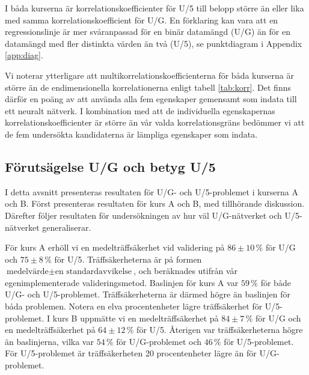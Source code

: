 I båda kurserna är korrelationskoefficienter för U/5 till belopp större än eller lika med samma korrelationskoefficient för U/G. En förklaring kan vara att en regressionslinje är mer svåranpassad för en binär datamängd (U/G) än för en datamängd med fler distinkta värden än två (U/5), se punktdiagram i Appendix \ref{app:diag}. 

Vi noterar ytterligare att multikorrelationskoefficienterna för båda kurserna är större än de endimensionella korrelationerna enligt tabell \ref{tab:korr}. Det finns därför en poäng av att använda alla fem egenskaper gemensamt som indata till ett neuralt nätverk. I kombination med att de individuella egenskapernas korrelationskoefficienter är större än vår valda korrelationsgräns bedömmer vi att de fem undersökta kandidaterna är lämpliga egenskaper som indata. 






\subsection{Förutsägelse U/G och betyg U/5}
\label{sec:results_ug_u5}

I detta avsnitt presenteras resultaten för U/G- och U/5-problemet i kurserna A och B. Först presenteras resultaten för kurs A och B, med tillhörande diskussion. Därefter följer resultaten för undersökningen av hur väl U/G-nätverket och U/5-nätverket generaliserar.

För kurs A erhöll vi en medelträffsäkerhet vid validering på $86\pm10 \, \%$ för U/G och $75\pm8 \, \%$ för U/5. Träffsäkerheterna är på formen $\text{medelvärde}\pm\text{en standardavvikelse}$, och beräknades utifrån vår egenimplementerade valideringsmetod. Baslinjen för kurs A var $59\, \%$ för både U/G- och U/5-problemet. Träffsäkerheterna är därmed högre än baslinjen för båda problemen. Notera en elva procentenheter lägre träffsäkerhet för U/5-problemet. I kurs B uppmätte vi en medelträffsäkerhet på $84\pm7 \, \% $ för U/G och en medelträffsäkerhet på $64\pm12 \,\%$ för U/5. Återigen var träffsäkerheterna högre än baslinjerna, vilka var $54\, \%$ för U/G-problemet och $46 \, \%$ för U/5-problemet. För U/5-problemet är träffsäkerheten 20 procentenheter lägre än för U/G-problemet.

